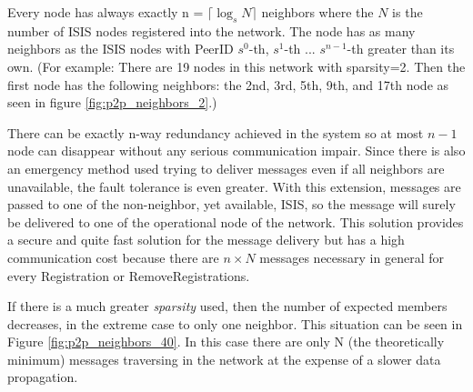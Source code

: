 \documentclass{book}
\begin{document}
Every node has always exactly n = $\lceil \log_s{N} \rceil$ neighbors where the $N$ is the number of ISIS nodes registered into the network. The node has as many neighbors as the ISIS nodes with PeerID $s^0$-th, $s^1$-th ... $s^{n-1}$-th greater than its own. (For example: There are 19 nodes in this network with sparsity=2. Then the first node has the following neighbors: the 2nd, 3rd, 5th, 9th, and 17th node as seen in figure \ref{fig:p2p_neighbors_2}.)

There can be exactly n-way redundancy achieved in the system so at most $n-1$ node can disappear without any serious communication impair. Since there is also an emergency method used trying to deliver messages even if all neighbors are unavailable, the fault tolerance is even greater. With this extension, messages are passed to one of the non-neighbor, yet available, ISIS, so the message will surely be delivered to one of the operational node of the network. This solution provides a secure and quite fast solution for the message delivery but has a high communication cost because there are $n \times N$ messages necessary in general for every Registration or RemoveRegistrations.

If there is a much greater {\it sparsity} used, then the number of expected members decreases, in the extreme case to only one neighbor. This situation can be seen in Figure \ref{fig:p2p_neighbors_40}. In this case there are only N (the theoretically minimum) messages traversing in the network at the expense of a slower data propagation.
\begin{figure}[ht]
\end{figure}
\end{document}
